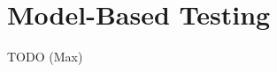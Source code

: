\documentclass{vldb}
\begin{document}














\section{Model-Based Testing}
\label{sec:model_based_testing}
TODO (Max)
\end{document}
